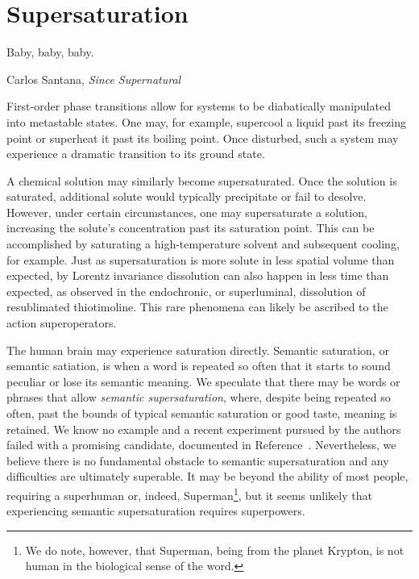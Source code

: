 \section{Supersaturation}

\epigraph{Baby, baby, baby.
}{Carlos Santana, \textit{Since Supernatural}}

First-order phase transitions allow for systems to be diabatically manipulated into metastable states.
One may, for example, supercool a liquid past its freezing point or superheat it past its boiling point.
Once disturbed, such a system may experience a dramatic transition to its ground state.

A chemical solution may similarly become supersaturated.
Once the solution is saturated, additional solute would typically precipitate or fail to desolve.
However, under certain circumstances, one may supersaturate a solution, increasing the solute's concentration past its saturation point.
This can be accomplished by saturating a high-temperature solvent and subsequent cooling, for example.
Just as supersaturation is more solute in less spatial volume than expected, by Lorentz invariance dissolution can also happen in less time than expected, as observed in the endochronic, or superluminal, dissolution of resublimated thiotimoline\cite{asimov:1948,asimov:1953,asimov:1960,vernon:2022}.
This rare phenomena can likely be ascribed to the action superoperators\cite{Deutsch:1991nm}.

The human brain may experience saturation directly.
Semantic saturation, or semantic satiation, is when a word is repeated so often that it starts to sound peculiar or lose its semantic meaning.
We speculate that there may be words or phrases that allow \emph{semantic supersaturation}, where, despite being repeated so often, past the bounds of typical semantic saturation or good taste, meaning is retained.
We know no example and a recent experiment pursued by the authors failed with a promising candidate, documented in Reference~\cite{self}.
Nevertheless, we believe there is no fundamental obstacle to semantic supersaturation and any difficulties are ultimately superable.
It may be beyond the ability of most people, requiring a superhuman or, indeed, Superman\footnote{We do note, however, that Superman, being from the planet Krypton, is not human in the biological sense of the word.}\cite{tippett:2009}, but it seems unlikely that experiencing semantic supersaturation requires superpowers.
